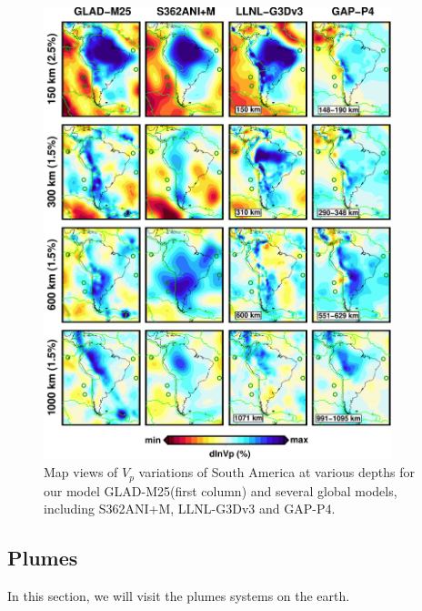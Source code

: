 \documentclass[extra,mreferee]{gji}
\begin{document}
\begin{figure}
\includegraphics[width=0.9\textwidth]{figures/depth_slice/south_america_vp.pdf}
  \caption{Map views of $V_p$ variations of South America at various depths for our model GLAD-M25(first column) and several global models, including S362ANI+M, LLNL-G3Dv3 and GAP-P4\citep{fukao2013subducted}.}
\label{fig:southamerica-vp}
\centering
\end{figure}

\subsection{Plumes}

In this section, we will visit the plumes systems on the earth.

\end{document}
